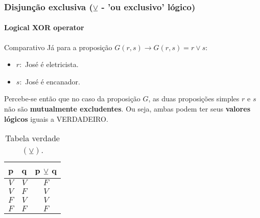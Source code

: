 \begin{frame}[t]
    \frametitle{Disjunção exclusiva ($\veebar$ - 'ou exclusivo' lógico)}
    \framesubtitle{Logical XOR operator}
    \vspace{-2mm}
    \begin{block}{Comparativo}
        Já para a proposição $G(r,s) \longrightarrow G(r,s) = r \lor s $:
        \begin{itemize}
            \item[] $r:$ José é eletricista.
            \item[] $s:$ José é encanador.
        \end{itemize}
        Percebe-se então que no caso da proposição $G$, as duas proposições simples $r$ e $s$ não são \textbf{mutualmente excludentes}. Ou seja, ambas podem ter seus \textbf{valores lógicos} iguais a VERDADEIRO. \\[2pt]
    \end{block}
    \vspace{-5mm}
    \begin{table}[ht]
        \caption{Tabela verdade $(\veebar)$.}
        \label{tab:tabela-xor}
        \begin{tabular}{|c|c|c|}
        \hline
        \rowcolor[HTML]{EFEFEF} 
        \textbf{p} & \textbf{q} & \textbf{p $\veebar$ q} \\ \hline
        $V$        & $V$        & $F$                    \\ \hline
        $V$        & $F$        & $V$                    \\ \hline
        $F$        & $V$        & $V$                    \\ \hline
        $F$        & $F$        & $F$                    \\ \hline
        \end{tabular}
    \end{table}
\end{frame}